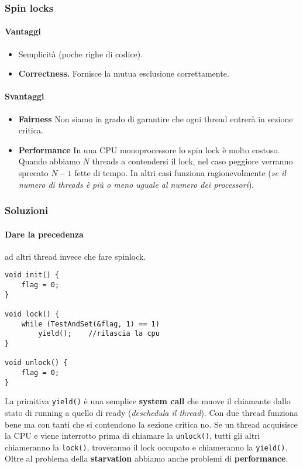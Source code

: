 \documentclass[12pt, letterpaper]{article}
\begin{document}
			\subsubsection{Spin locks}
				\paragraph{Vantaggi} 
				\begin{itemize}
					\item Semplicità (poche righe di codice).
					\item \textbf{Correctness.} Fornisce la mutua esclusione correttamente.
				\end{itemize}								
				
				\paragraph{Svantaggi} 
					\begin{itemize}
						\item \textbf{Fairness} Non siamo in grado di garantire che ogni thread entrerà in sezione critica.
						\item \textbf{Performance} In una CPU monoprocessore lo spin lock è molto costoso. Quando abbiamo $N$ threads a contendersi il lock, nel caso peggiore verranno sprecato $N-1$ fette di tempo. In altri casi funziona ragionevolmente (\textit{se il numero di threads è più o meno uguale al numero dei processori}).
					\end{itemize}
					
			\subsubsection{Soluzioni}
				\paragraph{Dare la precedenza} ad altri thread invece che fare spinlock.
				\begin{lstlisting}[style=CStyle]
void init() {
	flag = 0;
}

void lock() {
	while (TestAndSet(&flag, 1) == 1)
		yield(); 	//rilascia la cpu
}

void unlock() {
	flag = 0;
}				\end{lstlisting}
				La primitiva \texttt{yield()} è una semplice \textbf{system call} che muove il chiamante dallo stato di running a quello di ready (\textit{deschedula il thread}). Con due thread funziona bene ma con tanti che si contendono la sezione critica no. Se un thread acquisisce la CPU e viene interrotto prima di chiamare la \texttt{unlock()}, tutti gli altri chiameranno la \texttt{lock()}, troveranno il lock occupato e chiameranno la \texttt{yield()}. Oltre al problema della \textbf{starvation }abbiamo anche problemi di \textbf{performance}.
				
\end{document}
